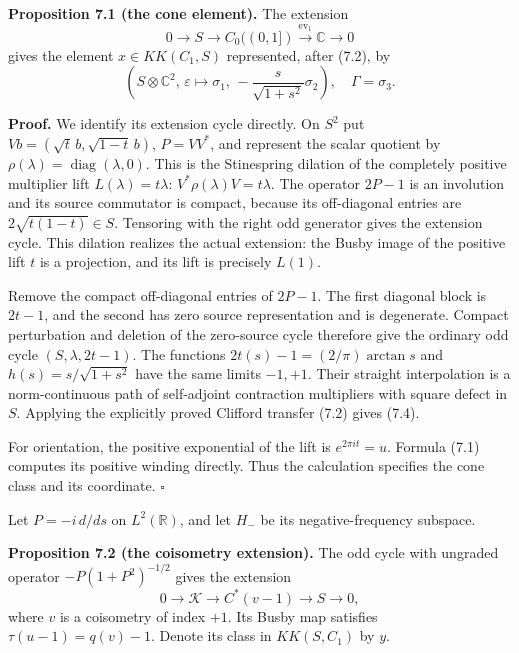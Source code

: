 \documentclass[
  11pt,
]{article}
\begin{document}
\textbf{Proposition 7.1 (the cone element).} The extension \[
0\longrightarrow S\longrightarrow C_0((0,1])
\xrightarrow{\operatorname{ev}_1}\mathbb C\longrightarrow0
\tag{7.3}
\] gives the element \(x\in KK(C_1,S)\) represented, after (7.2), by \[
\left(S\otimes\mathbb C^2,\,
\varepsilon\mapsto\sigma_1,\,
-\frac{s}{\sqrt{1+s^2}}\sigma_2\right),
\quad\Gamma=\sigma_3.
\tag{7.4}
\]

\textbf{Proof.} We identify its extension cycle directly. On \(S^2\) put
\(Vb=(\sqrt t\,b,\sqrt{1-t}\,b)\), \(P=VV^*\), and represent the scalar
quotient by \(\rho(\lambda)=\operatorname{diag}(\lambda,0)\). This is
the Stinespring dilation of the completely positive multiplier lift
\(L(\lambda)=t\lambda\): \(V^*\rho(\lambda)V=t\lambda\). The operator
\(2P-1\) is an involution and its source commutator is compact, because
its off-diagonal entries are \(2\sqrt{t(1-t)}\in S\). Tensoring with the
right odd generator gives the extension cycle. This dilation realizes
the actual extension: the Busby image of the positive lift \(t\) is a
projection, and its lift is precisely \(L(1)\).

Remove the compact off-diagonal entries of \(2P-1\). The first diagonal
block is \(2t-1\), and the second has zero source representation and is
degenerate. Compact perturbation and deletion of the zero-source cycle
therefore give the ordinary odd cycle \((S,\lambda,2t-1)\). The
functions \(2t(s)-1=(2/\pi)\arctan s\) and \(h(s)=s/\sqrt{1+s^2}\) have
the same limits \(-1,+1\). Their straight interpolation is a
norm-continuous path of self-adjoint contraction multipliers with square
defect in \(S\). Applying the explicitly proved Clifford transfer (7.2)
gives (7.4).

For orientation, the positive exponential of the lift is
\(e^{2\pi it}=u\). Formula (7.1) computes its positive winding directly.
Thus the calculation specifies the cone class and its coordinate.
\(\square\)

Let \(P=-i\,d/ds\) on \(L^2(\mathbb R)\), and let \(H_-\) be its
negative-frequency subspace.

\textbf{Proposition 7.2 (the coisometry extension).} The odd cycle with
ungraded operator \(-P(1+P^2)^{-1/2}\) gives the extension \[
0\longrightarrow\mathcal K\longrightarrow C^*(v-1)
\longrightarrow S\longrightarrow0,
\tag{7.5}
\] where \(v\) is a coisometry of index \(+1\). Its Busby map satisfies
\(\tau(u-1)=q(v)-1\). Denote its class in \(KK(S,C_1)\) by \(y\).
\end{document}
